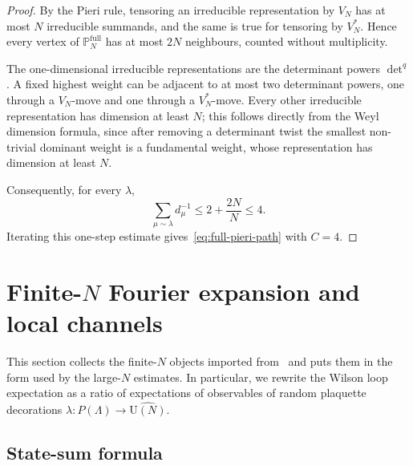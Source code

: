 \documentclass[11pt,a4paper,reqno]{amsart}
\theoremstyle{definition}
\theoremstyle{remark}
\newcommand\U{{\mathrm U}}
\begin{document}
\begin{proof}
By the Pieri rule, tensoring an irreducible representation by $V_N$ has at most $N$ irreducible summands, and the same is true for tensoring by $V_N^*$.  Hence every vertex of $\mathbb P_N^{\mathrm{full}}$ has at most $2N$ neighbours, counted without multiplicity.

The one-dimensional irreducible representations are the determinant powers $\det^q$.  A fixed highest weight can be adjacent to at most two determinant powers, one through a $V_N$-move and one through a $V_N^*$-move.  Every other irreducible representation has dimension at least $N$; this follows directly from the Weyl dimension formula, since after removing a determinant twist the smallest non-trivial dominant weight is a fundamental weight, whose representation has dimension at least $N$.

Consequently, for every $\lambda$,
\[
\sum_{\mu\sim\lambda}d_\mu^{-1}
\le 2+\frac{2N}{N}\le4.
\]
Iterating this one-step estimate gives~\eqref{eq:full-pieri-path} with $C=4$.
\end{proof}

\section{\texorpdfstring{Finite-$N$}{Finite-N} Fourier expansion and local channels}
\label{sec:finiteN}

This section collects the finite-$N$ objects imported from~\cite{Lem26a} and puts them in the form used by the large-$N$ estimates. In particular, we rewrite the Wilson loop expectation as a ratio of expectations of observables of random plaquette decorations $\lambda:P(\Lambda)\to\widehat{\U(N)}$.

\subsection{State-sum formula}
\end{document}
